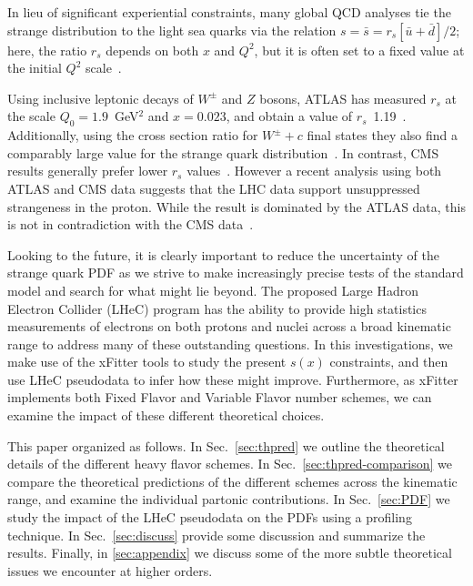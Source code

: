 \documentclass[pdftex,twocolumn,epjc3]{svjour3}          %
\begin{document}
In lieu of  significant experiential constraints,
many global QCD analyses tie the strange distribution 
to the light sea quarks 
via the relation $s= \bar{s}=r_s[\bar{u}+\bar{d}]/2$;
%
here, the ratio $r_s$ depends on both $x$ and $Q^2$, but
it is often set to a fixed value at the initial $Q^2$ scale~\cite{Kretzer:2003it, Martin:2004ir}.

Using inclusive leptonic decays of $W^\pm$ and $Z$ bosons, ATLAS has  measured  $r_s$
at the scale $Q_0 = 1.9$~GeV$^2$ and $x= 0.023$, and obtain a value of $r_s$~1.19~\cite{Aaboud:2016btc}.
%
Additionally, using the cross section ratio for $W^\pm +c$ final states they also find
a comparably large value for the strange quark distribution~\cite{Aad:2014xca}.
%
In contrast, CMS results generally prefer lower $r_s$ values~\cite{Chatrchyan:2013uja}.
However a recent analysis using both ATLAS and CMS data suggests that
the LHC data support unsuppressed strangeness
in the proton. While the result is  dominated by the ATLAS data, this is
not in contradiction with the CMS data~\cite{Cooper-Sarkar:2018ufj}.


Looking to the future, it is clearly important to reduce the uncertainty of the
strange quark PDF as we strive to make increasingly precise tests of the standard model and search
for what might lie beyond.
%
The proposed  Large Hadron Electron Collider (LHeC) program has the ability to provide high statistics measurements
of electrons on both protons and nuclei 
across a broad kinematic range to address many of these outstanding questions.
%
In this investigations, we make use of the
xFitter tools to study the present $s(x)$ constraints, and then use LHeC
pseudodata to infer how these might improve. Furthermore, as xFitter
implements both Fixed Flavor and Variable Flavor number schemes, we
can examine the impact of these different theoretical choices.


%  
%  

This paper organized as follows.
%
In  Sec.~\ref{sec:thpred} we outline the theoretical details
of the different heavy flavor schemes.
%
In  Sec.~\ref{sec:thpred-comparison} we compare the theoretical predictions
of the different schemes  across
the kinematic range, and examine the individual partonic contributions. 
%
In  Sec.~\ref{sec:PDF} we study the impact of the LHeC pseudodata
on the PDFs using a profiling technique. 
%
In  Sec.~\ref{sec:discuss} provide some discussion and summarize the results. 
%
Finally, in \ref{sec:appendix} we discuss some of the more subtle theoretical
issues we encounter at higher orders. 
\end{document}
